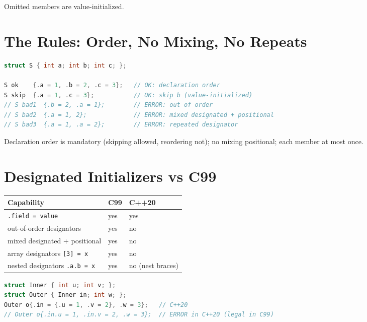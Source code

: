 Omitted members are value-initialized.

\section{The Rules: Order, No Mixing, No Repeats}
\label{sec:c20-designated-rules}

\begin{lstlisting}[language=C++,caption={What is and isn't allowed}]
struct S { int a; int b; int c; };

S ok    {.a = 1, .b = 2, .c = 3};   // OK: declaration order
S skip  {.a = 1, .c = 3};           // OK: skip b (value-initialized)
// S bad1  {.b = 2, .a = 1};        // ERROR: out of order
// S bad2  {.a = 1, 2};             // ERROR: mixed designated + positional
// S bad3  {.a = 1, .a = 2};        // ERROR: repeated designator
\end{lstlisting}

Declaration order is mandatory (skipping allowed, reordering not); no mixing positional; each member at most once.

\section{Designated Initializers vs C99}
\label{sec:c20-vs-c99}

\begin{center}
\begin{tabular}{lll}
\hline
\textbf{Capability} & \textbf{C99} & \textbf{C++20} \\
\hline
\texttt{.field = value} & yes & yes \\
out-of-order designators & yes & no \\
mixed designated + positional & yes & no \\
array designators \texttt{[3] = x} & yes & no \\
nested designators \texttt{.a.b = x} & yes & no (nest braces) \\
\hline
\end{tabular}
\end{center}

\begin{lstlisting}[language=C++,caption={Nested aggregates use nested braces}]
struct Inner { int u; int v; };
struct Outer { Inner in; int w; };
Outer o{.in = {.u = 1, .v = 2}, .w = 3};   // C++20
// Outer o{.in.u = 1, .in.v = 2, .w = 3};  // ERROR in C++20 (legal in C99)
\end{lstlisting}

